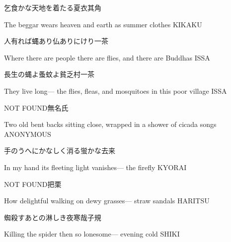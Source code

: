 \begin{haiku}
    {\FH 乞食かな天地を着たる夏衣}\hfill{\FH 其角}

    \vin{} The beggar
    \vin{} \vin{} wears heaven and earth
    \vin{} \vin{} \vin{} as summer clothes \hspace{\fill} KIKAKU
\end{haiku}

\begin{haiku}
    {\FH 人有れば蝿あり仏ありにけり}\hfill{\FH 一茶}

    \vin{} Where there are people
    \vin{} \vin{} there are flies, and
    \vin{} \vin{} \vin{} there are Buddhas \hspace{\fill} ISSA
\end{haiku}

\begin{haiku}
    {\FH 長生の蝿よ蚤蚊よ貧乏村}\hfill{\FH 一茶}

    \vin{} They live long---
    \vin{} \vin{} the flies, fleas, and mosquitoes
    \vin{} \vin{} \vin{} in this poor village \hspace{\fill} ISSA
\end{haiku}

\begin{haiku}
    NOT FOUND\hfill{\FH 無名氏}

    \vin{} Two old bent backs
    \vin{} \vin{} sitting close, wrapped in
    \vin{} \vin{} \vin{} a shower of cicada songs \hspace{\fill} ANONYMOUS
\end{haiku}

\begin{haiku}
    {\FH 手のうへにかなしく消る蛍かな}\hfill{\FH 去来}

    \vin{} In my hand
    \vin{} \vin{} its fleeting light vanishes---
    \vin{} \vin{} \vin{} the firefly \hspace{\fill} KYORAI
\end{haiku}

\begin{haiku}
    NOT FOUND\hfill{\FH 把栗}

    \vin{} How delightful
    \vin{} \vin{} walking on dewy grasses---
    \vin{} \vin{} \vin{} straw sandals \hspace{\fill} HARITSU
\end{haiku}

\begin{haiku}
    {\FH 蜘殺すあとの淋しき夜寒哉}\hfill{\FH 子規}

    \vin{} Killing the spider
    \vin{} \vin{} then so lonesome---
    \vin{} \vin{} \vin{} evening cold \hspace{\fill} SHIKI
\end{haiku}

